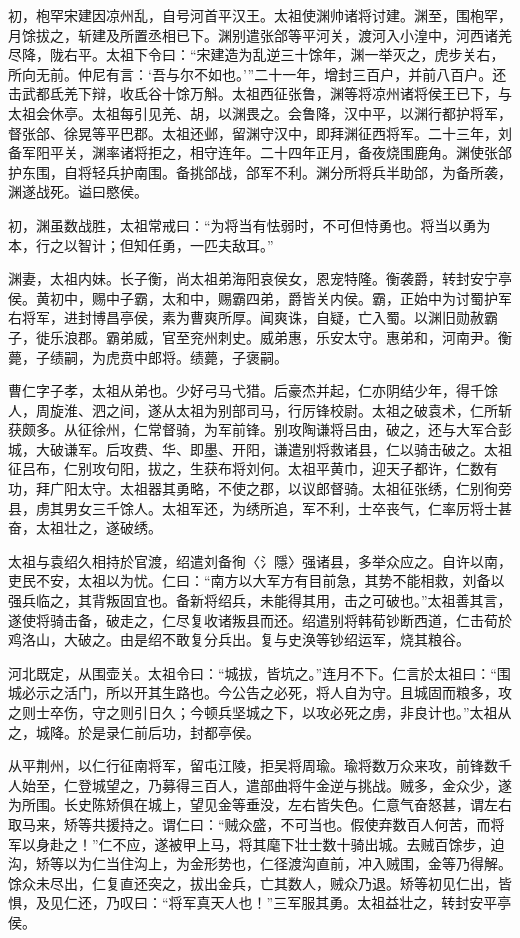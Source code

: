 \documentclass[12pt,UTF8]{ctexbook}
\begin{document}
初，枹罕宋建因凉州乱，自号河首平汉王。太祖使渊帅诸将讨建。渊至，围枹罕，月馀拔之，斩建及所置丞相已下。渊别遣张郃等平河关，渡河入小湟中，河西诸羌尽降，陇右平。太祖下令曰：“宋建造为乱逆三十馀年，渊一举灭之，虎步关右，所向无前。仲尼有言：‘吾与尔不如也。’”二十一年，增封三百户，并前八百户。还击武都氐羌下辩，收氐谷十馀万斛。太祖西征张鲁，渊等将凉州诸将侯王已下，与太祖会休亭。太祖每引见羌、胡，以渊畏之。会鲁降，汉中平，以渊行都护将军，督张郃、徐晃等平巴郡。太祖还邺，留渊守汉中，即拜渊征西将军。二十三年，刘备军阳平关，渊率诸将拒之，相守连年。二十四年正月，备夜烧围鹿角。渊使张郃护东围，自将轻兵护南围。备挑郃战，郃军不利。渊分所将兵半助郃，为备所袭，渊遂战死。谥曰愍侯。

初，渊虽数战胜，太祖常戒曰：“为将当有怯弱时，不可但恃勇也。将当以勇为本，行之以智计；但知任勇，一匹夫敌耳。”

渊妻，太祖内妹。长子衡，尚太祖弟海阳哀侯女，恩宠特隆。衡袭爵，转封安宁亭侯。黄初中，赐中子霸，太和中，赐霸四弟，爵皆关内侯。霸，正始中为讨蜀护军右将军，进封博昌亭侯，素为曹爽所厚。闻爽诛，自疑，亡入蜀。以渊旧勋赦霸子，徙乐浪郡。霸弟威，官至兖州刺史。威弟惠，乐安太守。惠弟和，河南尹。衡薨，子绩嗣，为虎贲中郎将。绩薨，子褒嗣。

曹仁字子孝，太祖从弟也。少好弓马弋猎。后豪杰并起，仁亦阴结少年，得千馀人，周旋淮、泗之间，遂从太祖为别部司马，行厉锋校尉。太祖之破袁术，仁所斩获颇多。从征徐州，仁常督骑，为军前锋。别攻陶谦将吕由，破之，还与大军合彭城，大破谦军。后攻费、华、即墨、开阳，谦遣别将救诸县，仁以骑击破之。太祖征吕布，仁别攻句阳，拔之，生获布将刘何。太祖平黄巾，迎天子都许，仁数有功，拜广阳太守。太祖器其勇略，不使之郡，以议郎督骑。太祖征张绣，仁别徇旁县，虏其男女三千馀人。太祖军还，为绣所追，军不利，士卒丧气，仁率厉将士甚奋，太祖壮之，遂破绣。

太祖与袁绍久相持於官渡，绍遣刘备徇〈氵隱〉强诸县，多举众应之。自许以南，吏民不安，太祖以为忧。仁曰：“南方以大军方有目前急，其势不能相救，刘备以强兵临之，其背叛固宜也。备新将绍兵，未能得其用，击之可破也。”太祖善其言，遂使将骑击备，破走之，仁尽复收诸叛县而还。绍遣别将韩荀钞断西道，仁击荀於鸡洛山，大破之。由是绍不敢复分兵出。复与史涣等钞绍运军，烧其粮谷。

河北既定，从围壶关。太祖令曰：“城拔，皆坑之。”连月不下。仁言於太祖曰：“围城必示之活门，所以开其生路也。今公告之必死，将人自为守。且城固而粮多，攻之则士卒伤，守之则引日久；今顿兵坚城之下，以攻必死之虏，非良计也。”太祖从之，城降。於是录仁前后功，封都亭侯。

从平荆州，以仁行征南将军，留屯江陵，拒吴将周瑜。瑜将数万众来攻，前锋数千人始至，仁登城望之，乃募得三百人，遣部曲将牛金逆与挑战。贼多，金众少，遂为所围。长史陈矫俱在城上，望见金等垂没，左右皆失色。仁意气奋怒甚，谓左右取马来，矫等共援持之。谓仁曰：“贼众盛，不可当也。假使弃数百人何苦，而将军以身赴之！”仁不应，遂被甲上马，将其麾下壮士数十骑出城。去贼百馀步，迫沟，矫等以为仁当住沟上，为金形势也，仁径渡沟直前，冲入贼围，金等乃得解。馀众未尽出，仁复直还突之，拔出金兵，亡其数人，贼众乃退。矫等初见仁出，皆惧，及见仁还，乃叹曰：“将军真天人也！”三军服其勇。太祖益壮之，转封安平亭侯。
\end{document}
